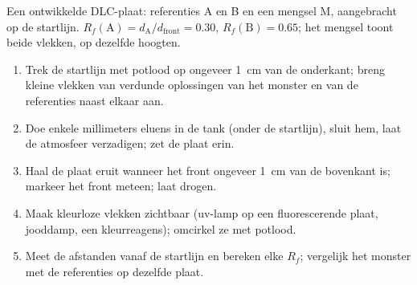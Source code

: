 \begin{omfigure}

{\small Een ontwikkelde DLC-plaat: referenties A en B en een mengsel M,
aangebracht op de startlijn. $R_f(\mathrm{A}) = d_{\mathrm{A}}/d_{\mathrm{front}}
= 0.30$, $R_f(\mathrm{B}) = 0.65$; het mengsel toont beide vlekken, op
dezelfde hoogten.}
\end{omfigure}

\begin{method}\label{met:b1:lab-techniques-1:tlc}
\begin{enumerate}
  \item Trek de startlijn met potlood op ongeveer \qty{1}{cm} van de
        onderkant; breng kleine vlekken van verdunde oplossingen van het
        monster en van de referenties naast elkaar aan.
  \item Doe enkele millimeters eluens in de tank (onder de startlijn),
        sluit hem, laat de atmosfeer verzadigen; zet de plaat erin.
  \item Haal de plaat eruit wanneer het front ongeveer \qty{1}{cm} van de
        bovenkant is; markeer het front meteen; laat drogen.
  \item Maak kleurloze vlekken zichtbaar (uv-lamp op een fluorescerende
        plaat, jooddamp, een kleurreagens); omcirkel ze met potlood.
  \item Meet de afstanden vanaf de startlijn en bereken elke $R_f$;
        vergelijk het monster met de referenties op dezelfde plaat.
\end{enumerate}
\end{method}

